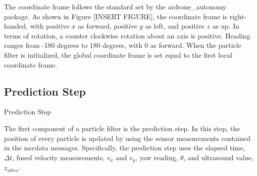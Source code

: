 			The coordinate frame follows the standard set by the ardrone\_autonomy package. As shown in Figure [INSERT FIGURE], the coordinate frame is right-handed, with positive $x$ as forward, positive $y$ as left, and positive $z$ as up. In terms of rotation, a counter clockwise rotation about an axis is positive. Heading ranges from -180 degrees to 180 degrees, with 0 as forward. When the particle filter is initialized, the global coordinate frame is set equal to the first local coordinate frame.



	\subsection{Prediction Step}

		\begin{algorithm}
			\centering
			\caption{Prediction Step} 
			\begin{algorithmic}[1]
						 \label{predict:line:theta}
						 \label{predict:line:transform}
						 \label{predict:line:position}
					\EndFor
				\EndFunction
			\end{algorithmic}
		\end{algorithm}

		The first component of a particle filter is the prediction step. In this step, the position of every particle is updated by using the sensor measurements contained in the navdata messages. Specifically, the prediction step uses the elapsed time, $\Delta t$, fused velocity measurements, $v_x$ and $v_y$, yaw reading, $\theta$, and ultrasound value, $z_{ultra}$.

